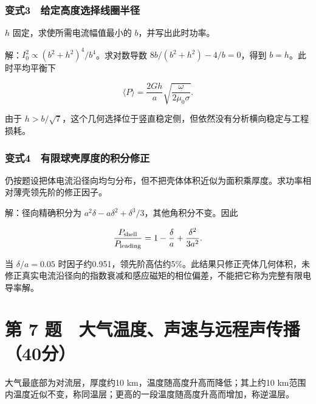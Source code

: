 \documentclass[12pt,a4paper,fontset=fandol]{ctexart}
\begin{document}
\subsubsection{变式3　给定高度选择线圈半径}\label{ux53d8ux5f0f3-ux7ed9ux5b9aux9ad8ux5ea6ux9009ux62e9ux7ebfux5708ux534aux5f84}

\(h\) 固定，求使所需电流幅值最小的 \(b\)，并写出此时功率。

解：\(I_0^2\propto(b^2+h^2)^4/b^4\)。求对数导数
\(8b/(b^2+h^2)-4/b=0\)，得到 \(b=h\)。此时平均平衡下

\[\langle P\rangle=\frac{2Gh}{a}
\sqrt{\frac{\omega}{2\mu_0\sigma}}.\]

由于
\(h>b/\sqrt7\)，这个几何选择位于竖直稳定侧，但依然没有分析横向稳定与工程损耗。

\noindent\begin{minipage}{\linewidth}
\subsubsection{变式4　有限球壳厚度的积分修正}\label{ux53d8ux5f0f4-ux6709ux9650ux7403ux58f3ux539aux5ea6ux7684ux79efux5206ux4feeux6b63}

仍按题设把体电流沿径向均匀分布，但不把壳体体积近似为面积乘厚度。求功率相对薄壳领先阶的修正因子。

解：径向精确积分为
\(a^2\delta-a\delta^2+\delta^3/3\)，其他角积分不变。因此

\[\frac{P_{\rm shell}}{P_{\rm leading}}
=1-\frac\delta a+\frac{\delta^2}{3a^2}.\]

当 \(\delta/a=0.05\)
时因子约0.951，领先阶高估约5\%。此结果只修正壳体几何体积，未修正真实电流沿径向的指数衰减和感应磁矩的相位偏差，不能把它称为完整有限电导率解。


\end{minipage}

\clearpage

\section{第 7
题　大气温度、声速与远程声传播（40分）}\label{ux7b2c-7-ux9898-ux5927ux6c14ux6e29ux5ea6ux58f0ux901fux4e0eux8fdcux7a0bux58f0ux4f20ux64ad40ux5206}

大气最底部为对流层，厚度约10 km，温度随高度升高而降低；其上约10
km范围内温度近似不变，称同温层；更高的一段温度随高度升高而增加，称逆温层。
\end{document}

